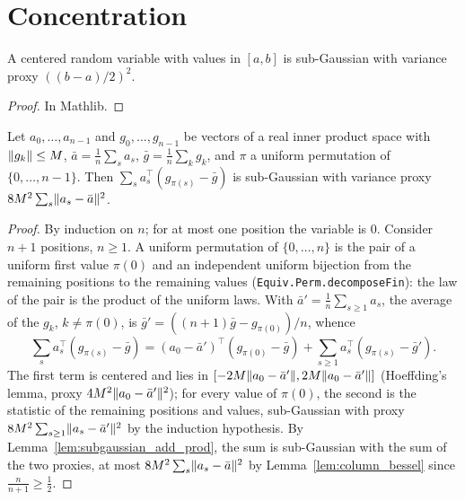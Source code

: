 \chapter{Concentration}
\label{chap:prereq_concentration}

\begin{lemma}
  \label{lem:hoeffding_lemma}
  \leanok
  A centered random variable with values in $[a, b]$ is sub-Gaussian with variance proxy
  $((b - a)/2)^2$.
\end{lemma}

\begin{proof}
  \leanok
  In Mathlib.
\end{proof}

\begin{lemma}
  \label{lem:sampling_without_replacement}
  \leanok
  Let $a_0, \dots, a_{n-1}$ and $g_0, \dots, g_{n-1}$ be vectors of a real inner product space with
  $\lVert g_k \rVert \le M$, $\bar a = \frac1n \sum_s a_s$, $\bar g = \frac1n \sum_k g_k$, and $\pi$ a
  uniform permutation of $\{0, \dots, n - 1\}$. Then $\sum_s a_s^\top (g_{\pi(s)} - \bar g)$ is
  sub-Gaussian with variance proxy $8M^2 \sum_s \lVert a_s - \bar a \rVert^2$.
\end{lemma}

\begin{proof}
  \leanok
  By induction on $n$; for at most one position the variable is $0$. Consider $n + 1$ positions,
  $n \ge 1$. A uniform permutation of $\{0, \dots, n\}$ is the pair of a uniform first value
  $\pi(0)$ and an independent uniform bijection from the remaining positions to the remaining
  values (\texttt{Equiv.Perm.decomposeFin}): the law of the pair is the product of the uniform
  laws. With $\bar a' = \frac1n \sum_{s \ge 1} a_s$, the average of the $g_k$, $k \ne \pi(0)$, is
  $\bar g' = ((n + 1) \bar g - g_{\pi(0)}) / n$, whence
  \[
    \sum_s a_s^\top (g_{\pi(s)} - \bar g) = (a_0 - \bar a')^\top (g_{\pi(0)} - \bar g)
      + \sum_{s \ge 1} a_s^\top (g_{\pi(s)} - \bar g').
  \]
  The first term is centered and lies in $[-2M \lVert a_0 - \bar a' \rVert, 2M \lVert a_0 - \bar a' \rVert]$
  (Hoeffding's lemma, proxy $4M^2 \lVert a_0 - \bar a' \rVert^2$); for every value of $\pi(0)$, the second
  is the statistic of the remaining positions and values, sub-Gaussian with proxy
  $8M^2 \sum_{s \ge 1} \lVert a_s - \bar a' \rVert^2$ by the induction hypothesis. By
  Lemma~\ref{lem:subgaussian_add_prod}, the sum is sub-Gaussian with the sum of the two proxies,
  at most $8M^2 \sum_s \lVert a_s - \bar a \rVert^2$ by Lemma~\ref{lem:column_bessel} since
  $\frac{n}{n + 1} \ge \frac12$.
\end{proof}

